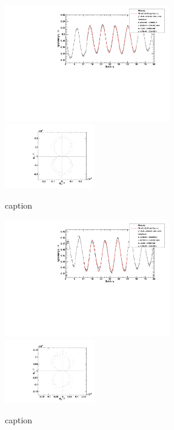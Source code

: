 \begin{figure}[H]
\begin{center}
  \includegraphics[width=0.64\textwidth]{../img/fit_Spule_R3.pdf}
  \includegraphics[width=0.35\textwidth]{../img/polar_Spule_R3.pdf}
  \caption{caption}
  \label{img:R3}
\end{center}
\end{figure}

\begin{figure}[H]
\begin{center}
  \includegraphics[width=0.64\textwidth]{../img/fit_Spule_R4.pdf}
  \includegraphics[width=0.35\textwidth]{../img/polar_Spule_R4.pdf}
  \caption{caption}
  \label{img:R4}
\end{center}
\end{figure}

